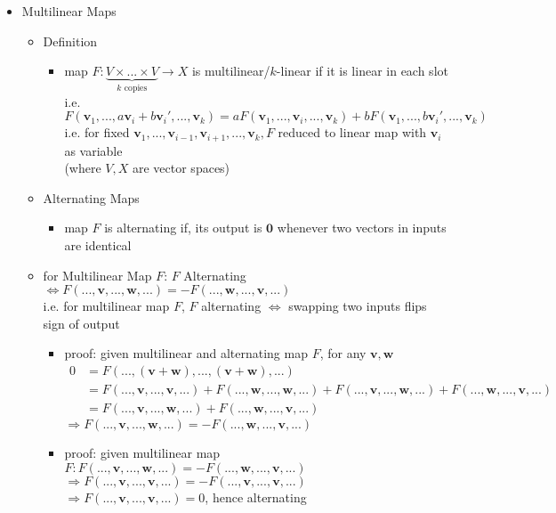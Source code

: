 \begin{itemize}
\item Multilinear Maps
	\begin{itemize}
	\item Definition
		\begin{itemize}
		\item map $F:\underbrace{V\times...\times V}_{k \text{ copies}} \rightarrow X$ is multilinear/$k$-linear if it is linear in each slot \\
		i.e. $F(\mathbf v_1, ..., a\mathbf v_i+b\mathbf v_i',...,\mathbf v_k) = aF(\mathbf v_1, ..., \mathbf v_i,...,\mathbf v_k) + bF(\mathbf v_1, ..., b\mathbf v_i',...,\mathbf v_k)$ \\ 
		i.e. for fixed $\mathbf v_1,...,\mathbf v_{i-1},\mathbf v_{i+1},...,\mathbf v_{k}, F$ reduced to linear map with $\mathbf v_i$ as variable \\ 
		(where $V, X$ are vector spaces)
		\end{itemize}
	\item Alternating Maps
		\begin{itemize}
		\item map $F$ is alternating if, its output is $\mathbf 0$ whenever two vectors in inputs are identical
		\end{itemize}
	\item for Multilinear Map $F$: $F$ Alternating $\Leftrightarrow F(...,\mathbf v,...,\mathbf w, ...)=-F(...,\mathbf w,...,\mathbf v, ...)$ \\
	i.e. for multilinear map $F$, $F$ alternating $\Leftrightarrow$ swapping two inputs flips sign of output
		\begin{itemize}
		\item proof: given multilinear and alternating map $F$, for any $\mathbf v, \mathbf w$
		\begin{align*}
		0 &= F(..., (\mathbf v+\mathbf w), ..., (\mathbf v+\mathbf w), ...) \\
		&= F(...,\mathbf v, ..., \mathbf v, ...) + F(...,\mathbf w, ..., \mathbf w, ...) + F(...,\mathbf v, ..., \mathbf w, ...) + F(...,\mathbf w, ..., \mathbf v, ...) \\
		&= F(...,\mathbf v, ..., \mathbf w, ...) + F(...,\mathbf w, ..., \mathbf v, ...)
		\end{align*}
		$\Rightarrow F(...,\mathbf v, ..., \mathbf w, ...) = -F(...,\mathbf w, ..., \mathbf v, ...)$
		\item proof: given multilinear map $F: F(...,\mathbf v, ..., \mathbf w, ...) = -F(...,\mathbf w, ..., \mathbf v, ...)$ \\
		$\Rightarrow F(...,\mathbf v, ..., \mathbf v, ...) = -F(...,\mathbf v, ..., \mathbf v, ...)$ \\
		$\Rightarrow F(...,\mathbf v, ..., \mathbf v, ...) = 0$, hence alternating
				
		\end{itemize}
	\end{itemize}
\end{itemize}


